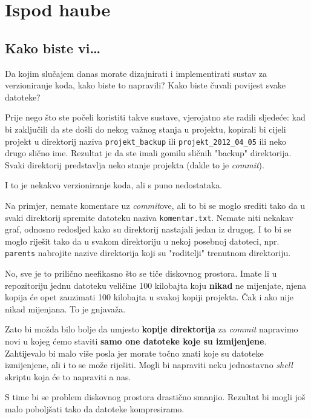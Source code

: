 \chapter*{Ispod haube}

\section*{Kako biste vi\dots}

Da kojim slučajem danas morate dizajnirati i implementirati sustav za verzioniranje koda, kako biste to napravili?
Kako biste čuvali povijest svake datoteke?

Prije nego što ste počeli koristiti takve sustave, vjerojatno ste radili sljedeće: kad bi zaključili da ste došli do nekog važnog stanja u projektu, kopirali bi cijeli projekt u direktorij naziva \verb+projekt_backup+ ili \verb+projekt_2012_04_05+ ili neko drugo slično ime.
Rezultat je da ste imali gomilu sličnih "backup" direktorija.
Svaki direktorij predstavlja neko stanje projekta (dakle to je \emph{commit}).

I to je nekakvo verzioniranje koda, ali s puno nedostataka.

Na primjer, nemate komentare uz \emph{commit}ove, ali to bi se moglo srediti tako da u svaki direktorij spremite datoteku naziva \verb+komentar.txt+.
Nemate niti nekakav graf, odnosno redosljed kako su direktorij nastajali jedan iz drugog.
I to bi se moglo riješit tako da u svakom direktoriju u nekoj posebnoj datoteci, npr. \verb+parents+ nabrojite nazive direktorija koji su "roditelji" trenutnom direktoriju.

No, sve je to prilično neefikasno što se tiče diskovnog prostora. 
Imate li u repozitoriju jednu datoteku veličine 100 kilobajta koju \textbf{nikad} ne mijenjate, njena kopija će opet zauzimati 100 kilobajta u svakoj kopiji projekta.
Čak i ako nije nikad mijenjana.
To je gnjavaža.

Zato bi možda bilo bolje da umjesto \textbf{kopije direktorija} za \emph{commit} napravimo novi u kojeg ćemo staviti \textbf{samo one datoteke koje su izmijenjene}.
Zahtijevalo bi malo više posla jer morate točno znati koje su datoteke izmijenjene, ali i to se može riješiti.
Mogli bi napraviti neku jednostavno \emph{shell} skriptu koja će to napraviti a nas. 

S time bi se problem diskovnog prostora drastično smanjio. 
Rezultat bi mogli još malo poboljšati tako da datoteke kompresiramo.

